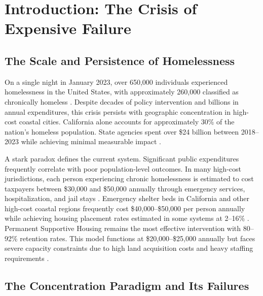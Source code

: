 \documentclass[12pt, letterpaper]{article}
\begin{document}
\newpage
\begingroup
{}
\setlength{\cftbeforesecskip}{2pt}
\setlength{\cftbeforesubsecskip}{-2pt}
\tableofcontents
\endgroup

\newpage
{}



\section{Introduction: The Crisis of Expensive Failure}

\subsection{The Scale and Persistence of Homelessness}

On a single night in January 2023, over 650,000 individuals experienced homelessness in the United States, with approximately 260,000 classified as chronically homeless \citep{hud_ahar_2023}. Despite decades of policy intervention and billions in annual expenditures, this crisis persists with geographic concentration in high-cost coastal cities. California alone accounts for approximately 30\% of the nation's homeless population. State agencies spent over \$24 billion between 2018--2023 while achieving minimal measurable impact \citep{lao_2023}.

A stark paradox defines the current system. Significant public expenditures frequently correlate with poor population-level outcomes. In many high-cost jurisdictions, each person experiencing chronic homelessness is estimated to cost taxpayers between \$30,000 and \$50,000 annually through emergency services, hospitalization, and jail stays \citep{greendoors_2024, culhane_metraux_hadley_2002}. Emergency shelter beds in California and other high-cost coastal regions frequently cost \$40,000--\$50,000 per person annually while achieving housing placement rates estimated in some systems at 2--16\% \citep{guardian_2024, maine_housing_2023}. Permanent Supportive Housing remains the most effective intervention with 80--92\% retention rates. This model functions at \$20,000--\$25,000 annually but faces severe capacity constraints due to high land acquisition costs and heavy staffing requirements \citep{berkeley_2023}.

\subsection{The Concentration Paradigm and Its Failures}
\end{document}
